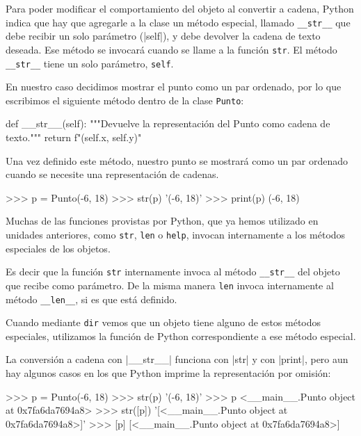 Para poder modificar el comportamiento del objeto al convertir a cadena, Python
indica que hay que agregarle a la clase un método especial, llamado
\lstinline+__str__+ que debe recibir un solo parámetro (|self|), y
debe devolver la cadena de texto deseada.  Ese método
se invocará cuando se llame a la función \lstinline!str!.
El método \lstinline+__str__+ tiene un solo parámetro, \lstinline!self!.

En nuestro caso decidimos mostrar el punto como un par ordenado, por lo que
escribimos el siguiente método dentro de la clase \lstinline!Punto!:

\begin{codigo-python-sn}
    def __str__(self):
        """Devuelve la representación del Punto como
           cadena de texto."""
        return f"({self.x}, {self.y})"
\end{codigo-python-sn}

Una vez definido este método, nuestro punto se mostrará como un par
ordenado cuando se necesite una representación de cadenas.

\begin{codigo-python-sn}
>>> p = Punto(-6, 18)
>>> str(p)
'(-6, 18)'
>>> print(p)
(-6, 18)
\end{codigo-python-sn}

\begin{sabias_que}
Muchas de las funciones provistas por Python, que ya hemos utilizado en
unidades anteriores, como \lstinline!str!, \lstinline!len! o
\lstinline!help!, invocan internamente a los métodos especiales de los
objetos.

Es decir que la función \lstinline!str!  internamente invoca al método
\lstinline!__str__! del objeto que recibe como parámetro. De la misma
manera \lstinline!len! invoca internamente al método \lstinline!__len__!,
si es que está definido.

Cuando mediante \lstinline!dir! vemos que un objeto tiene alguno de estos
métodos especiales, utilizamos la función de Python correspondiente
a ese método especial.
\end{sabias_que}

La conversión a cadena con |__str__| funciona con |str| y con |print|, pero aun
hay algunos casos en los que Python imprime la representación por omisión:

\begin{codigo-python-sn}
>>> p = Punto(-6, 18)
>>> str(p)
'(-6, 18)'
>>> p
<__main__.Punto object at 0x7fa6da7694a8>
>>> str([p])
'[<__main__.Punto object at 0x7fa6da7694a8>]'
>>> [p]
[<__main__.Punto object at 0x7fa6da7694a8>]
\end{codigo-python-sn}

